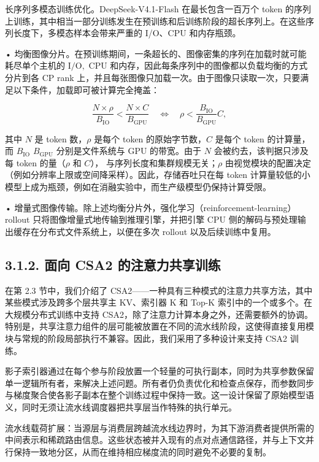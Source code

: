 长序列多模态训练优化。DeepSeek-V4.1-Flash 在最长包含一百万个 token 的序列上训练，其中相当一部分训练发生在预训练和后训练阶段的超长序列上。在这些序列长度下，多模态样本会带来严重的 I/O、CPU 和内存瓶颈。

• 均衡图像分片。在预训练期间，一条超长的、图像密集的序列在加载时就可能耗尽单个主机的
\(\mathrm { I } / \mathrm { O } ,\) CPU 和内存，因此每条序列中的图像都以负载均衡的方式分片到各 CP rank 上，并且每张图像只加载一次。由于图像只读取一次，只要满足以下条件，加载即可被计算完全掩盖：

\[
\frac { N \times \rho } { B _ { \mathrm { I O } } } < \frac { N \times C } { B _ { \mathrm { G P U } } } \quad \Longleftrightarrow \quad \rho < \frac { B _ { \mathrm { I O } } } { B _ { \mathrm { G P U } } } C ,
\]

其中 $N$ 是 token 数，$\rho$ 是每个 token 的原始字节数，$C$ 是每个 token 的计算量，而 \(B _ { \mathrm { I O } }\)
\(B _ { \mathrm { G P U } }\) 分别是文件系统与 GPU 的带宽。由于 $N$ 会被约去，该判据只涉及每 token 的量（$\rho$ 和 $C$），
与序列长度和集群规模无关；$\rho$ 由视觉模块的配置决定（例如分辨率上限或空间降采样）。因此，存储吞吐只在每 token 计算量较低的小模型上成为瓶颈，例如在消融实验中，而生产级模型仍保持计算受限。

• 增量式图像传输。除上述均衡分片外，强化学习（reinforcement-learning）rollout 只将图像增量式地传输到推理引擎，并把引擎 CPU 侧的解码与预处理输出缓存在分布式文件系统上，以便在多次 rollout 以及后续训练中复用。

\subsection{3.1.2. 面向 CSA2 的注意力共享训练}\label{attention-sharing-trainingfor-csa2}

在第 2.3 节中，我们介绍了 CSA2——一种具有三种模式的注意力共享方法，其中某些模式涉及跨多个层共享主 KV、索引器 K 和 Top-K 索引中的一个或多个。在大规模分布式训练中支持 CSA2，除了注意力计算本身之外，还需要额外的协调。特别是，共享注意力组件的层可能被放置在不同的流水线阶段，这使得直接复用模块与常规的阶段局部执行不兼容。因此，我们采用了多种设计来支持 CSA2 训练。

影子索引器通过在每个参与阶段放置一个轻量的可执行副本，同时为共享参数保留单一逻辑所有者，来解决上述问题。所有者仍负责优化和检查点保存，而参数同步与梯度聚合使各影子副本在整个训练过程中保持一致。这一设计保留了原始模型语义，同时无须让流水线调度器把共享层当作特殊的执行单元。



流水线载荷扩展：当源层与消费层跨越流水线边界时，为其下游消费者提供所需的中间表示和稀疏路由信息。这些状态被并入现有的点对点通信路径，并与上下文并行保持一致地分区，从而在维持相应梯度流的同时避免不必要的复制。

